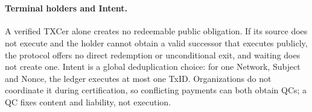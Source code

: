 
\paragraph{Terminal holders and Intent.}
A verified TXCer alone creates no redeemable public obligation. If its source
does not execute and the holder cannot obtain a valid successor that executes
publicly, the protocol offers no direct redemption or unconditional exit, and
waiting does not create one. Intent is a global deduplication choice: for one
Network, Subject and Nonce, the ledger executes at most one TxID.
Organizations do not coordinate it during certification, so conflicting
payments can both obtain QCs; a QC fixes content and liability, not execution.
 
